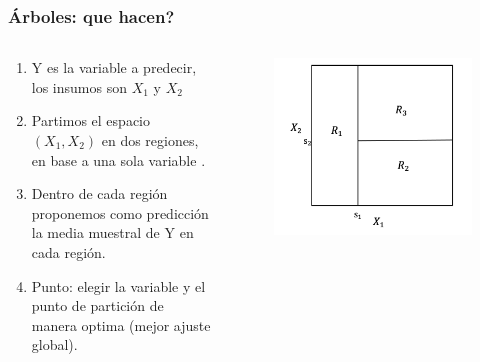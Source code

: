 \documentclass[
  shownotes,
  xcolor={svgnames},
  hyperref={colorlinks,citecolor=DarkBlue,linkcolor=DarkRed,urlcolor=DarkBlue}
  , aspectratio=169]{beamer}
\begin{document}
\begin{frame}[fragile]
\frametitle{Árboles: que hacen?}


\begin{columns}[T] %
\begin{column}{.42\textwidth}
  
\begin{enumerate}
    \footnotesize
\item Y es la variable a predecir, los insumos son $X_1$ y $X_2$
\item  Partimos el espacio $(X_1,X_2)$ en dos regiones, en base a una sola variable .
\item Dentro de cada región proponemos como predicción la media muestral de Y en cada región.
\item Punto: elegir la variable y el punto de partición de manera optima (mejor ajuste global).
\end{enumerate}


\end{column}  
\hfill
\begin{column}{.48\textwidth}

 \begin{figure}[H] \centering
            \captionsetup{justification=centering}
              \includegraphics[scale=0.4]{figures/cart4}                           
 \end{figure}

\end{column}
\end{columns}

\end{frame}
\end{document}
